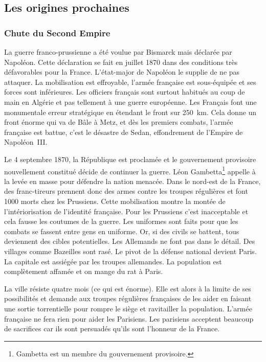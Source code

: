 \documentclass[12pt]{report}
\begin{document}
\subsection{Les origines prochaines}


\subsubsection{Chute du Second Empire}

La guerre franco-prussienne a été voulue par Bismarck mais déclarée par Napoléon.
Cette déclaration se fait en juillet 1870 dans des conditions très défavorables pour la France. 
L’état-major de Napoléon le supplie de ne pas attaquer. 
La mobilisation est effroyable, l’armée française est sous-équipée et ses forces sont inférieures. 
Les officiers français sont surtout habitués au coup de main en Algérie et pas tellement à une guerre européenne.
Les Français font une monumentale erreur stratégique en étendant le front sur 250~km.
Cela donne un front énorme qui va de Bâle à Metz, et dès les premiers combats, l’armée française est battue, c'est le désastre de Sedan, effondrement de l'Empire de Napoléon~III.

Le 4 septembre 1870, la République est proclamée et le gouvernement provisoire nouvellement constitué décide de continuer la guerre. 
Léon Gambetta\footnote{Gambetta est un membre du gouvernement provisoire.} appelle à la levée en masse pour défendre la nation menacée.
Dans le nord-est de la France, des franc-tireurs prennent donc des armes contre les troupes régulières et font 1000 morts chez les Prussiens.
Cette mobilisation montre la montée de l’intériorisation de l’identité française.
Pour les Prussiens c’est inacceptable et cela fausse les coutumes de la guerre. 
Les uniformes sont faits pour que les combats se fassent entre gens en uniforme.
Or, si des civils se battent, tous deviennent des cibles potentielles.
Les Allemands ne font pas dans le détail.
Des villages comme Bazeilles sont rasé.
Le pivot de la défense national devient Paris.
La capitale est assiégée par les troupes allemandes.
La population est complètement affamée et on mange du rat à Paris.

La ville résiste quatre mois (ce qui est énorme). 
Elle est alors à la limite de ses possibilités et demande aux troupes régulières françaises de les aider en faisant une sortie torrentielle pour rompre le siège et ravitailler la population.
L’armée française ne fera rien pour aider les Parisiens.
Les parisiens acceptent beaucoup de sacrifices car ils sont persuadés qu'ils sont l'honneur de la France.
\end{document}
